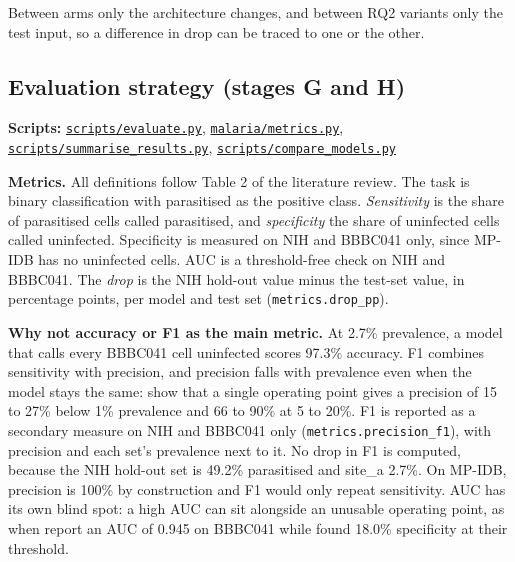 \documentclass[11pt,a4paper]{article}
\begin{document}
Between arms only the architecture changes, and between RQ2 variants only the test input, so a difference in drop can be traced to one or the other.

\subsection{Evaluation strategy (stages G and H)}

\textbf{Scripts:} \href{https://gitlab.uvt.nl/capstone/2026-fall/u927271/-/blob/v1.0-final/scripts/evaluate.py}{\texttt{scripts/\allowbreak{}evaluate.\allowbreak{}py}}, \href{https://gitlab.uvt.nl/capstone/2026-fall/u927271/-/blob/v1.0-final/malaria/metrics.py}{\texttt{malaria/\allowbreak{}metrics.\allowbreak{}py}}, \href{https://gitlab.uvt.nl/capstone/2026-fall/u927271/-/blob/v1.0-final/scripts/summarise_results.py}{\texttt{scripts/\allowbreak{}summarise\_\allowbreak{}results.\allowbreak{}py}}, \href{https://gitlab.uvt.nl/capstone/2026-fall/u927271/-/blob/v1.0-final/scripts/compare_models.py}{\texttt{scripts/\allowbreak{}compare\_\allowbreak{}models.\allowbreak{}py}}

\textbf{Metrics.} All definitions follow Table 2 of the literature review. The task is binary classification with parasitised as the positive class. \emph{Sensitivity} is the share of parasitised cells called parasitised, and \emph{specificity} the share of uninfected cells called uninfected. Specificity is measured on NIH and BBBC041 only, since MP-IDB has no uninfected cells. AUC is a threshold-free check on NIH and BBBC041. The \emph{drop} is the NIH hold-out value minus the test-set value, in percentage points, per model and test set (\texttt{metrics.\allowbreak{}drop\_\allowbreak{}pp}).

\textbf{Why not accuracy or F1 as the main metric.} At 2.7\% prevalence, a model that calls every BBBC041 cell uninfected scores 97.3\% accuracy. F1 combines sensitivity with precision, and precision falls with prevalence even when the model stays the same: \citet{hou2026} show that a single operating point gives a precision of 15 to 27\% below 1\% prevalence and 66 to 90\% at 5 to 20\%. F1 is reported as a secondary measure on NIH and BBBC041 only (\texttt{metrics.\allowbreak{}precision\_\allowbreak{}f1}), with precision and each set's prevalence next to it. No drop in F1 is computed, because the NIH hold-out set is 49.2\% parasitised and site\_\allowbreak{}a 2.7\%. On MP-IDB, precision is 100\% by construction and F1 would only repeat sensitivity. AUC has its own blind spot: a high AUC can sit alongside an unusable operating point, as when \citet{zhao2020} report an AUC of 0.945 on BBBC041 while \citet{hou2026} found 18.0\% specificity at their threshold.
\end{document}
